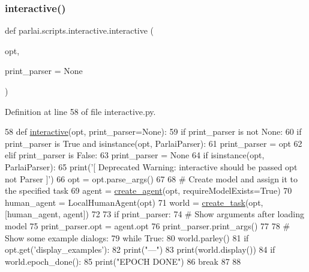 \subsubsection{\texorpdfstring{interactive()}{interactive()}}
{\footnotesize\ttfamily def parlai.\+scripts.\+interactive.\+interactive (\begin{DoxyParamCaption}\item[{}]{opt,  }\item[{}]{print\+\_\+parser = {\ttfamily None} }\end{DoxyParamCaption})}



Definition at line 58 of file interactive.\+py.


\begin{DoxyCode}
58 \textcolor{keyword}{def }\hyperlink{namespaceprojects_1_1self__feeding_1_1interactive_aaebd4c577ab0371c73e8442be469ebab}{interactive}(opt, print\_parser=None):
59     \textcolor{keywordflow}{if} print\_parser \textcolor{keywordflow}{is} \textcolor{keywordflow}{not} \textcolor{keywordtype}{None}:
60         \textcolor{keywordflow}{if} print\_parser \textcolor{keywordflow}{is} \textcolor{keyword}{True} \textcolor{keywordflow}{and} isinstance(opt, ParlaiParser):
61             print\_parser = opt
62         \textcolor{keywordflow}{elif} print\_parser \textcolor{keywordflow}{is} \textcolor{keyword}{False}:
63             print\_parser = \textcolor{keywordtype}{None}
64     \textcolor{keywordflow}{if} isinstance(opt, ParlaiParser):
65         print(\textcolor{stringliteral}{'[ Deprecated Warning: interactive should be passed opt not Parser ]'})
66         opt = opt.parse\_args()
67 
68     \textcolor{comment}{# Create model and assign it to the specified task}
69     agent = \hyperlink{namespaceparlai_1_1core_1_1agents_a00d77a7e26fb89e8bd900f7b2a02982a}{create\_agent}(opt, requireModelExists=\textcolor{keyword}{True})
70     human\_agent = LocalHumanAgent(opt)
71     world = \hyperlink{namespaceparlai_1_1core_1_1worlds_a79969c7ba76d4b3c500f5bb776444dc6}{create\_task}(opt, [human\_agent, agent])
72 
73     \textcolor{keywordflow}{if} print\_parser:
74         \textcolor{comment}{# Show arguments after loading model}
75         print\_parser.opt = agent.opt
76         print\_parser.print\_args()
77 
78     \textcolor{comment}{# Show some example dialogs:}
79     \textcolor{keywordflow}{while} \textcolor{keyword}{True}:
80         world.parley()
81         \textcolor{keywordflow}{if} opt.get(\textcolor{stringliteral}{'display\_examples'}):
82             print(\textcolor{stringliteral}{"---"})
83             print(world.display())
84         \textcolor{keywordflow}{if} world.epoch\_done():
85             print(\textcolor{stringliteral}{"EPOCH DONE"})
86             \textcolor{keywordflow}{break}
87 
88 
\end{DoxyCode}
\mbox{\label{namespaceparlai_1_1scripts_1_1interactive_a873c4ae402aee061884a22139a5a442f}} 
